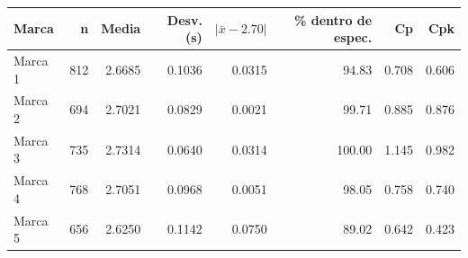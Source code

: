 \begin{tabular}{lrrrrrrr}
\toprule
\textbf{Marca} & \textbf{n} & \textbf{Media} & \textbf{Desv. (s)} & \textbf{$|\bar x-2.70|$} & \textbf{\% dentro de espec.} & \textbf{Cp} & \textbf{Cpk} \\ \midrule
Marca 1 & 812 & 2.6685 & 0.1036 & 0.0315 & 94.83 & 0.708 & 0.606 \\
Marca 2 & 694 & 2.7021 & 0.0829 & 0.0021 & 99.71 & 0.885 & 0.876 \\
Marca 3 & 735 & 2.7314 & 0.0640 & 0.0314 & 100.00 & 1.145 & 0.982 \\
Marca 4 & 768 & 2.7051 & 0.0968 & 0.0051 & 98.05 & 0.758 & 0.740 \\
Marca 5 & 656 & 2.6250 & 0.1142 & 0.0750 & 89.02 & 0.642 & 0.423 \\
\bottomrule
\end{tabular}